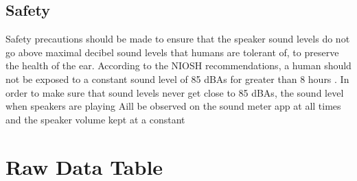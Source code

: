 \documentclass[index]{subfiles}
\begin{document}
\subsection{Safety}

Safety precautions should be made to ensure that the speaker sound levels do not go above maximal decibel sound levels that humans are tolerant of, to preserve the health of the ear. According to the NIOSH recommendations, a human should not be exposed to a constant sound level of 85 dBAs for greater than 8 hours \cite{cdc}. In order to make sure that sound levels never get close to 85 dBAs, the sound level when speakers are playing Aill be observed on the sound meter app at all times and the speaker volume kept at a constant

\section{Raw Data Table}
\end{document}
